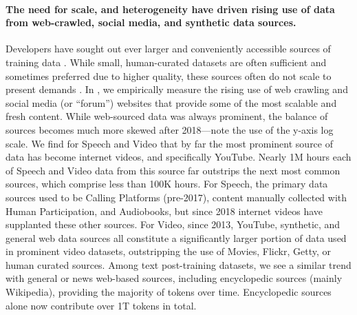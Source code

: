 \paragraph{The need for scale, and heterogeneity have driven rising use of data from web-crawled, social media, and synthetic data sources.}
Developers have sought out ever larger and conveniently accessible sources of training data \citep{hoffmann2022training, henighan2020scalinglawsautoregressivegenerative}.
While small, human-curated datasets are often sufficient and sometimes preferred due to higher quality, these sources often do not scale to present demands \citep{kaplan2020scaling, henighan2020scalinglawsautoregressivegenerative}.
In , we empirically measure the rising use of web crawling and social media (or ``forum'') websites that provide some of the most scalable and fresh content.
While web-sourced data was always prominent, the balance of sources becomes much more skewed after 2018---note the use of the y-axis log scale.
We find for Speech and Video that by far the most prominent source of data has become internet videos, and specifically YouTube. 
Nearly 1M hours each of Speech and Video data from this source far outstrips the next most common sources, which comprise less than 100K hours.
For Speech, the primary data sources used to be Calling Platforms (pre-2017), content manually collected with Human Participation, and Audiobooks, but since 2018 internet videos have supplanted these other sources.
For Video, since 2013, YouTube, synthetic, and general web data sources all constitute a significantly larger portion of data used in prominent video datasets, outstripping the use of Movies, Flickr, Getty, or human curated sources.
Among text post-training datasets, we see a similar trend with general or news web-based sources, including encyclopedic sources (mainly Wikipedia), providing the majority of tokens over time.
Encyclopedic sources alone now contribute over 1T tokens in total.

